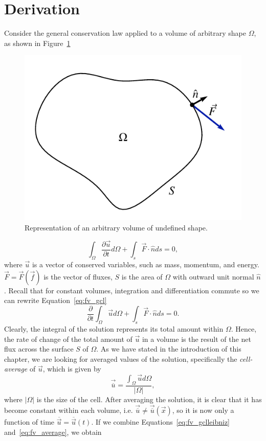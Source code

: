 \section{Derivation}
Consider the general conservation law applied to a volume of arbitrary shape $\Omega$, as shown in Figure~\ref{fig:fv_omega}
\begin{figure}[htbp]
 \centering
 \includegraphics[width=0.4\linewidth]{Pictures/ch11_fv_arbitrary_volume}
 \caption{Representation of an arbitrary volume of undefined shape.}
 \label{fig:fv_omega}
\end{figure}
\begin{equation}
 \int_\Omega \frac{\partial \vec u}{\partial t} d \Omega + \int_s \vec F\cdot \hat n ds = 0,
 \label{eq:fv_gcl}
\end{equation}
where $\vec{u}$ is a vector of conserved variables, such as mass, momentum, and energy. $\vec{F}=\vec F(\vec f)$ is the vector of fluxes, $S$ is the area of $\Omega$ with outward unit normal $\hat n$. Recall that for constant volumes, integration and differentiation commute so we can rewrite Equation~\ref{eq:fv_gcl}
\begin{equation}
 \frac{\partial}{\partial t} \int_\Omega \vec{u} d\Omega + \int_s \vec F\cdot \hat n ds = 0.
 \label{eq:fv_gclleibniz}
\end{equation}
Clearly, the integral of the solution represents its total amount within $\Omega$. Hence, the rate of change of the total amount of $\vec{u}$ in a volume is the result of the net flux across the surface $S$ of $\Omega$. As we have stated in the introduction of this chapter, we are looking for averaged values of the solution, specifically the \textit{cell-average} of $\vec u$, which is given by
\begin{equation}
 \vec {\overline{u}} = \frac{ \int_\Omega \vec u d\Omega} {|\Omega|},
 \label{eq:fv_average}
\end{equation}
where $|\Omega|$ is the size of the cell. After averaging the solution, it is clear that it has become constant within each volume, i.e. $\vec {\overline u} \neq \vec {\overline u} (\vec x)$, so it is now only a function of time $\overline {\vec u} = \overline {\vec u} (t)$. If we combine Equations~\ref{eq:fv_gclleibniz} and~\ref{eq:fv_average}, we obtain
